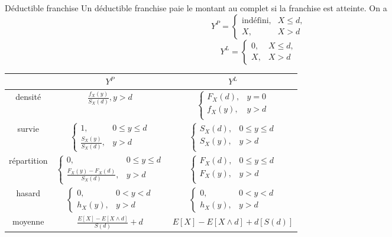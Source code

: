 \begin{definition}{Déductible franchise}{}
	Un déductible franchise paie le montant au complet si la franchise est atteinte. On a 
	$$Y^P = \begin{cases}
		\text{indéfini}, & X\leq d, \\
		X,               & X > d
	\end{cases}$$
	$$Y^L = \begin{cases}
		0, & X\leq d, \\
		X, & X > d
	\end{cases}$$
\end{definition}


\begin{center}
	\begin{tabular}{ccc}
		\hline
		            &                     $Y^P$                      &      $Y^L$       \\ \hline
		  densité   & $\displaystyle \frac{f_{X}(y)}{S_{X}(d)}, y>d$ & $\displaystyle \begin{cases} F_{X}(d),& y = 0\\ f_{X}(y),& y > d\\ \end{cases}$ \\
		  survie    & $\displaystyle \begin{cases}	1,&0\leq y\leq d\\ \frac{S_X(y)}{S_{X}(d)},& y>d \end{cases}$ & $\displaystyle \begin{cases} S_{X}(d),& 0\leq y\leq d\\ S_{X}(y),& y > d\\ \end{cases}$ \\
		répartition & $\displaystyle \begin{cases}	0,&0\leq y\leq d\\ \frac{F_{X}(y) - F_{X}(d)}{S_{X}(d)},& y>d \end{cases}$ & $\displaystyle \begin{cases} F_{X}(d),& 0\leq y\leq d\\ F_{X}(y),& y > d\\ \end{cases}$ \\
		  hasard    & $\displaystyle \begin{cases}	0,&0< y< d\\ h_{X}(y),& y>d \end{cases}$ & $\displaystyle \begin{cases}	0,&0< y< d\\ h_{X}(y),& y>d \end{cases}$ \\
		  moyenne   & $\displaystyle \frac{E[X] - E\left[X\wedge d\right]}{S(d)} + d$ & $\displaystyle E[X] - E[X \wedge d] + d\left[S(d)\right]$ \\ \hline
	\end{tabular}
\end{center}

